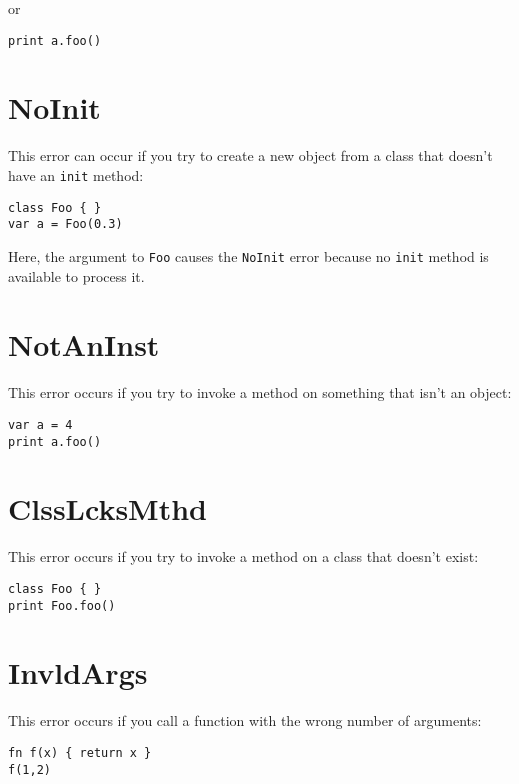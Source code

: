 or

\begin{lstlisting}
print a.foo()
\end{lstlisting}

\hypertarget{noinit}{%
\section{NoInit}\label{noinit}}

This error can occur if you try to create a new object from a class that
doesn't have an \texttt{init} method:

\begin{lstlisting}
class Foo { }
var a = Foo(0.3)
\end{lstlisting}

Here, the argument to \texttt{Foo} causes the \texttt{NoInit} error
because no \texttt{init} method is available to process it.

\hypertarget{notaninst}{%
\section{NotAnInst}\label{notaninst}}

This error occurs if you try to invoke a method on something that isn't
an object:

\begin{lstlisting}
var a = 4
print a.foo()
\end{lstlisting}

\hypertarget{clsslcksmthd}{%
\section{ClssLcksMthd}\label{clsslcksmthd}}

This error occurs if you try to invoke a method on a class that doesn't
exist:

\begin{lstlisting}
class Foo { }
print Foo.foo()
\end{lstlisting}

\hypertarget{invldargs}{%
\section{InvldArgs}\label{invldargs}}

This error occurs if you call a function with the wrong number of
arguments:

\begin{lstlisting}
fn f(x) { return x }
f(1,2)
\end{lstlisting}

